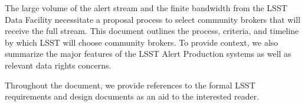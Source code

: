 The large volume of the alert stream and the finite bandwidth from the LSST Data Facility necessitate a proposal process to select community brokers that will receive the full stream.
This document outlines the process, criteria, and timeline by which LSST will choose community brokers.
To provide context, we also summarize the major features of the LSST Alert Production systems as well as relevant data rights concerns.

Throughout the document, we provide references to the formal LSST requirements and  design documents as an aid to the interested reader.
